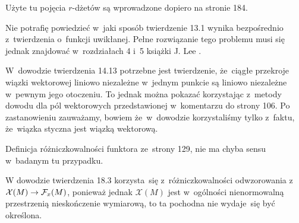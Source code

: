 \documentclass[a4paper,11pt]{article}
\begin{document}
\vspace{\spaceFour}



\start {} Użyte tu pojęcia $r$-dżetów są wprowadzone
dopiero na stronie 184.

\vspace{\spaceFour}



\start {} Nie potrafię powiedzieć w~jaki sposób twierdzenie
13.1 wynika bezpośrednio z~twierdzenia o~funkcji uwikłanej. Pełne
rozwiązanie tego problemu musi się jednak znajdować w~rozdziałach 4
i~5 książki J. Lee \cite{LeeIntroductionToSmoothManifolds2013}.

\vspace{\spaceFour}



\start {} W~dowodzie twierdzenia 14.13 potrzebne jest
twierdzenie, że~ciągłe przekroje wiązki wektorowej liniowo niezależne
w~jednym punkcie są liniowo niezależne w~pewnym jego otoczeniu. To
jednak można pokazać korzystając z~metody dowodu dla pól wektorowych
przedstawionej w~komentarzu do strony 106. Po zastanowieniu zauważamy,
bowiem że~w~dowodzie korzystaliśmy tylko z~faktu, że~wiązka styczna
jest wiązką wektorową.

\vspace{\spaceFour}



\start {} Definicja różniczkowalności funktora ze~strony 129,
nie ma chyba sensu w~badanym tu przypadku.

\vspace{\spaceFour}



\start {} W dowodzie twierdzenia 18.3 korzysta~się
z~różniczkowalności odwzorowania
z~$\mathcal{X}( M ) \to \mathcal{F}_{ x }( M )$, ponieważ jednak
$\mathcal{X}( M )$ jest w~ogólności nienormowalną przestrzenią
nieskończenie wymiarową, to ta pochodna nie wydaje~się być określona.

\vspace{\spaceFour}



\end{document}
